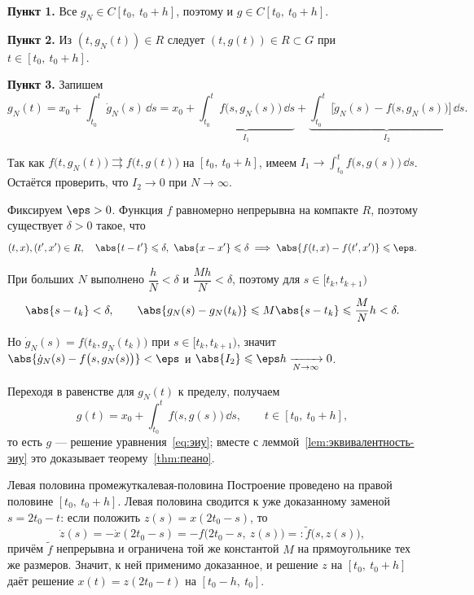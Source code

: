 \textbf{Пункт 1.} Все $g_N \in C[t_0,\ t_0+h]$, поэтому и
$g \in C[t_0,\ t_0+h]$.

\textbf{Пункт 2.} Из $(t, g_N(t)) \in R$ следует $(t, g(t)) \in R \subset G$
при $t \in [t_0,\ t_0+h]$.

\textbf{Пункт 3.} Запишем
\[
g_N(t) = x_0 + \int_{t_0}^{t} \dot g_N(s)\,\dd s
= x_0
+ \underbrace{\int_{t_0}^{t} f\bigl(s, g_N(s)\bigr)\,\dd s}_{I_1}
+ \underbrace{\int_{t_0}^{t}
	\bigl[\dot g_N(s) - f\bigl(s, g_N(s)\bigr)\bigr]\,\dd s}_{I_2}.
\]

Так как $f\bigl(t, g_N(t)\bigr) \rightrightarrows f\bigl(t, g(t)\bigr)$ на
$[t_0,\ t_0+h]$, имеем $I_1 \to \int_{t_0}^{t} f\bigl(s, g(s)\bigr)\,\dd s$.
Остаётся проверить, что $I_2 \to 0$ при $N \to \infty$.

Фиксируем $\eps > 0$. Функция $f$ равномерно непрерывна на компакте $R$,
поэтому существует $\delta > 0$ такое, что
\[
(t,x), (t',x') \in R,\quad \abs{t - t'} \leqslant \delta,\
\abs{x - x'} \leqslant \delta
\implies \abs{f(t,x) - f(t',x')} \leqslant \eps.
\]

При больших $N$ выполнено $\dfrac{h}{N} < \delta$ и
$\dfrac{Mh}{N} < \delta$, поэтому для $s \in [t_k, t_{k+1})$
\[
\abs{s - t_k} < \delta,
\qquad
\abs{g_N(s) - g_N(t_k)} \leqslant M\abs{s - t_k} \leqslant \frac{M}{N}h < \delta.
\]

Но $\dot g_N(s) = f\bigl(t_k, g_N(t_k)\bigr)$ при $s \in [t_k, t_{k+1})$,
значит $\abs{\dot g_N(s) - f\bigl(s, g_N(s)\bigr)} < \eps$ и
$\abs{I_2} \leqslant \eps h \xrightarrow[N \to \infty]{} 0$.

Переходя в равенстве для $g_N(t)$ к пределу, получаем
\[
g(t) = x_0 + \int_{t_0}^{t} f\bigl(s, g(s)\bigr)\,\dd s,
\qquad t \in [t_0,\ t_0+h],
\]
то есть $g$ --- решение уравнения~\eqref{eq:эиу}; вместе с
леммой~\ref{lem:эквивалентность-эиу} это доказывает
теорему~\ref{thm:пеано}.

\begin{Remark}[addon]{Левая половина промежутка}{левая-половина}
	Построение проведено на правой половине $[t_0,\ t_0+h]$.
	Левая половина сводится к уже доказанному заменой
	$s = 2t_0 - t$: если положить $z(s) = x(2t_0 - s)$, то
	\[
	\dot z(s) = -\dot x(2t_0 - s) = -f\bigl(2t_0 - s,\ z(s)\bigr)
	=: \tilde f\bigl(s, z(s)\bigr),
	\]
	причём $\tilde f$ непрерывна и ограничена той же константой $M$ на
	прямоугольнике тех же размеров. Значит, к ней применимо доказанное, и
	решение $z$ на $[t_0,\ t_0+h]$ даёт решение $x(t) = z(2t_0 - t)$ на
	$[t_0-h,\ t_0]$.
\end{Remark}

